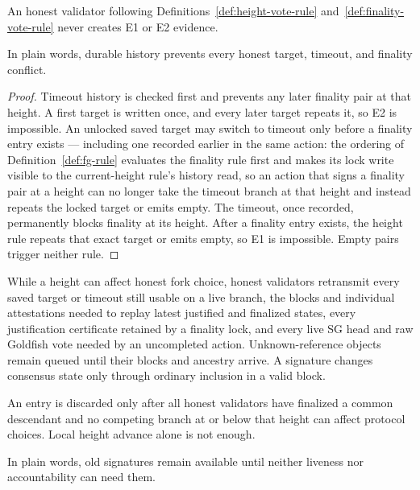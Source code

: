 \begin{lemma}
\label{lem:signer-safety}
An honest validator following
Definitions~\ref{def:height-vote-rule} and~\ref{def:finality-vote-rule}
never creates E1 or E2 evidence.

In plain words, durable history prevents every honest target, timeout, and
finality conflict.
\end{lemma}

\begin{proof}
Timeout history is checked first and prevents any later finality pair at that
height.  A first target is written once, and every later target repeats it,
so E2 is impossible.  An unlocked saved target may switch to timeout only
before a finality entry exists --- including one recorded earlier in the
same action: the ordering of Definition~\ref{def:fg-rule} evaluates the
finality rule first and makes its lock write visible to the
current-height rule's history read, so an action that signs a finality
pair at a height can no longer take the timeout branch at that height
and instead repeats the locked target or emits empty.  The timeout, once
recorded, permanently blocks finality at its height.
After a finality entry exists, the height rule repeats that exact target or
emits empty, so E1 is impossible.  Empty pairs trigger neither rule.
\end{proof}

\begin{definition}
\label{def:earlier-votes}
While a height can affect honest fork choice, honest validators retransmit
every saved target or timeout still usable on a live branch, the blocks and
individual attestations needed to replay latest justified and finalized
states, every justification certificate retained by a finality lock, and
every live SG head and raw Goldfish vote needed by an uncompleted action.
Unknown-reference objects remain queued until their blocks and ancestry
arrive.  A signature changes consensus state only through ordinary inclusion
in a valid block.

An entry is discarded only after all honest validators have finalized a
common descendant and no competing branch at or below that height can affect
protocol choices.  Local height advance alone is not enough.

In plain words, old signatures remain available until neither liveness nor
accountability can need them.
\end{definition}

